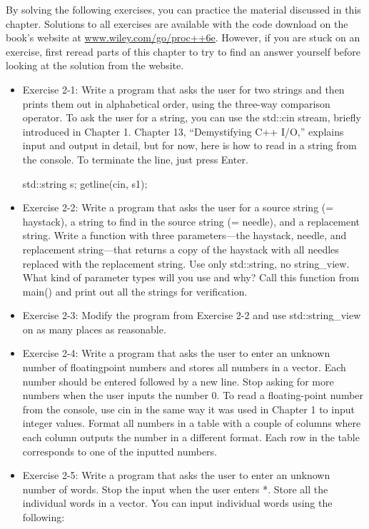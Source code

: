 By solving the following exercises, you can practice the material discussed in this chapter. Solutions to all exercises are available with the code download on the book’s website at \url{www.wiley.com/go/proc++6e}. However, if you are stuck on an exercise, first reread parts of this chapter to try to find an answer yourself before looking at the solution from the website.

\begin{itemize}
\item
Exercise 2-1: Write a program that asks the user for two strings and then prints them out in alphabetical order, using the three-way comparison operator. To ask the user for a string, you can use the std::cin stream, briefly introduced in Chapter 1. Chapter 13, “Demystifying C++ I/O,” explains input and output in detail, but for now, here is how to read in a string from the console. To terminate the line, just press Enter.

\begin{cpp}
std::string s;
getline(cin, s1);
\end{cpp}

\item
Exercise 2-2: Write a program that asks the user for a source string (= haystack), a string to find in the source string (= needle), and a replacement string. Write a function with three parameters—the haystack, needle, and replacement string—that returns a copy of the haystack with all needles replaced with the replacement string. Use only std::string, no string\_view. What kind of parameter types will you use and why? Call this function from main() and print out all the strings for verification.

\item
Exercise 2-3: Modify the program from Exercise 2-2 and use std::string\_view on as many places as reasonable.

\item
Exercise 2-4: Write a program that asks the user to enter an unknown number of floatingpoint numbers and stores all numbers in a vector. Each number should be entered followed by a new line. Stop asking for more numbers when the user inputs the number 0. To read a floating-point number from the console, use cin in the same way it was used in Chapter 1 to input integer values. Format all numbers in a table with a couple of columns where each column outputs the number in a different format. Each row in the table corresponds to one of the inputted numbers.

\item
Exercise 2-5: Write a program that asks the user to enter an unknown number of words. Stop the input when the user enters *. Store all the individual words in a vector. You can input individual words using the following:


\end{itemize}

